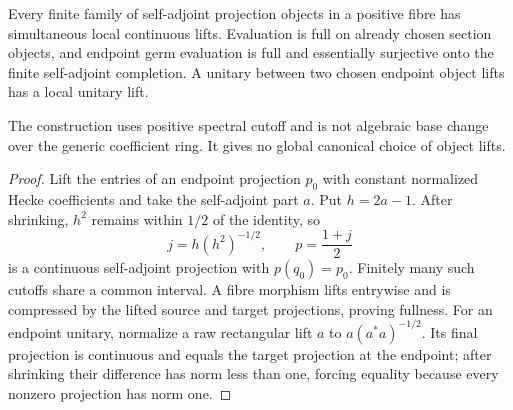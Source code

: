 \begin{theorem}
{\normalfont\statusProved}\quad
Every finite family of self-adjoint projection objects in a positive fibre
has simultaneous local continuous lifts.  Evaluation is full on already
chosen section objects, and endpoint germ evaluation is full and essentially
surjective onto the finite self-adjoint completion.  A unitary between two
chosen endpoint object lifts has a local unitary lift.
\end{theorem}
\begin{scope}
The construction uses positive spectral cutoff and is not algebraic base
change over the generic coefficient ring.  It gives no global canonical
choice of object lifts.
\end{scope}
\begin{proof}
Lift the entries of an endpoint projection $p_0$ with constant normalized
Hecke coefficients and take the self-adjoint part $a$.  Put $h=2a-1$.
After shrinking, $h^2$ remains within $1/2$ of the identity, so
\[
 j=h(h^2)^{-1/2},\qquad p=\frac{1+j}{2}
\]
is a continuous self-adjoint projection with $p(q_0)=p_0$.  Finitely many
such cutoffs share a common interval.  A fibre morphism lifts entrywise and
is compressed by the lifted source and target projections, proving fullness.
For an endpoint unitary, normalize a raw rectangular lift $a$ to
$a(a^*a)^{-1/2}$.  Its final projection is continuous and equals the target
projection at the endpoint; after shrinking their difference has norm less
than one, forcing equality because every nonzero projection has norm one.
\end{proof}

